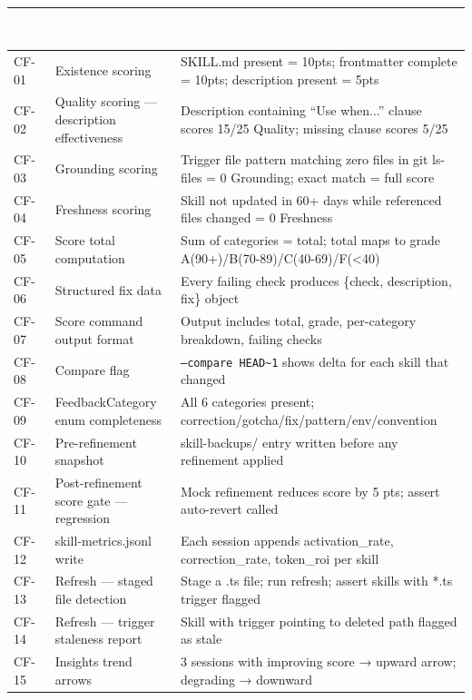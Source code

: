 \documentclass[11pt,letterpaper]{article}
\newcommand{\tableheader}[1]{\textbf{\sffamily\textcolor{white}{#1}}}
\begin{document}
\begin{center}
\begin{tabularx}{\textwidth}{C{1.5cm}L{5cm}X}
\toprule
{}
\tableheader{Test ID} & \tableheader{Verifies} & \tableheader{Expected} \\
\midrule
CF-01 & Existence scoring & SKILL.md present = 10pts; frontmatter complete = 10pts; description present = 5pts \\
CF-02 & Quality scoring — description effectiveness & Description containing ``Use when...'' clause scores 15/25 Quality; missing clause scores 5/25 \\
CF-03 & Grounding scoring & Trigger file pattern matching zero files in git ls-files = 0 Grounding; exact match = full score \\
CF-04 & Freshness scoring & Skill not updated in 60+ days while referenced files changed = 0 Freshness \\
CF-05 & Score total computation & Sum of categories = total; total maps to grade A(90+)/B(70-89)/C(40-69)/F(<40) \\
CF-06 & Structured fix data & Every failing check produces \{check, description, fix\} object \\
CF-07 & Score command output format & Output includes total, grade, per-category breakdown, failing checks \\
CF-08 & Compare flag & \texttt{--compare HEAD\textasciitilde{}1} shows delta for each skill that changed \\
CF-09 & FeedbackCategory enum completeness & All 6 categories present; correction/gotcha/fix/pattern/env/convention \\
CF-10 & Pre-refinement snapshot & skill-backups/ entry written before any refinement applied \\
CF-11 & Post-refinement score gate — regression & Mock refinement reduces score by 5 pts; assert auto-revert called \\
CF-12 & skill-metrics.jsonl write & Each session appends activation\_rate, correction\_rate, token\_roi per skill \\
CF-13 & Refresh — staged file detection & Stage a .ts file; run refresh; assert skills with *.ts trigger flagged \\
CF-14 & Refresh — trigger staleness report & Skill with trigger pointing to deleted path flagged as stale \\
CF-15 & Insights trend arrows & 3 sessions with improving score → upward arrow; degrading → downward \\
\bottomrule
\end{tabularx}
\end{center}
\end{document}
